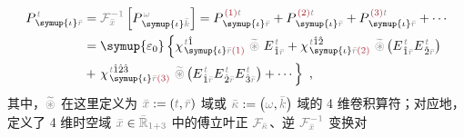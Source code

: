 \begin{subequations}
	\abovedisplayskip=10pt
	\belowdisplayskip=12pt
\begin{align}
	P^{\;\!\mathcolor{gray}{t}}_{\;\! \symup{\iota}\mathcolor{gray}{\bar{r}}} &= \mathcolor{gray}{\mathcal F_{\bar{x}}^{-1}} \left[ P^{\;\! \mathcolor{gray}{\omega}}_{\;\! \symup{\iota}\mathcolor{gray}{\bar{k}}} \right] = P^{\;\! \textcolor{Maroon}{(1)} \mathcolor{gray}{t}}_{\;\! \symup{\iota}\mathcolor{gray}{\bar{r}}} + P^{\;\! \textcolor{Maroon}{(2)} \mathcolor{gray}{t}}_{\;\! \symup{\iota}\mathcolor{gray}{\bar{r}}} + P^{\;\! \textcolor{Maroon}{(3)} \mathcolor{gray}{t}}_{\;\! \symup{\iota}\mathcolor{gray}{\bar{r}}} + \cdots \\ &= {\symup{\varepsilon_0}} \left\{ \chi^{\;\! \mathcolor{gray}{t} \hat{1}}_{\;\! \symup{\iota} \mathcolor{gray}{\bar{r}} \textcolor{Maroon}{(1)}} ~\mathcolor{gray}{\widetilde \circledast}~ E^{\;\!\mathcolor{gray}{t}}_{\;\! \hat{1} \mathcolor{gray}{\bar{r}}} + \chi^{\;\! \mathcolor{gray}{t} \hat{1} \hat{2}}_{\;\! \symup{\iota} \mathcolor{gray}{\bar{r}} \textcolor{Maroon}{(2)}}~\mathcolor{gray}{\widetilde \circledast}\left( E^{\;\!\mathcolor{gray}{t}}_{\;\! \hat{1} \mathcolor{gray}{\bar{r}}} E^{\;\!\mathcolor{gray}{t}}_{\;\! \hat{2} \mathcolor{gray}{\bar{r}}} \right) \right. \label{eq:P_tr} \\ &+ \left. \chi^{\;\! \mathcolor{gray}{t} \hat{1} \hat{2} \hat{3}}_{\;\! \symup{\iota} \mathcolor{gray}{\bar{r}} \textcolor{Maroon}{(3)}}~\mathcolor{gray}{\widetilde \circledast}\left( E^{\;\!\mathcolor{gray}{t}}_{\;\! \hat{1} \mathcolor{gray}{\bar{r}}} E^{\;\!\mathcolor{gray}{t}}_{\;\! \hat{2} \mathcolor{gray}{\bar{r}}} E^{\;\!\mathcolor{gray}{t}}_{\;\! \hat{3} \mathcolor{gray}{\bar{r}}} \right) + \cdots \right\}~,
\end{align}
\end{subequations}
其中，$\mathcolor{gray}{\widetilde \circledast}$ 在这里定义为 $\mathcolor{gray}{\bar{x}} := \left( \mathcolor{gray}{t}, \mathcolor{gray}{\bar{r}} \right)$ 域或 $\mathcolor{gray}{\bar{\kappa}} := \left( \mathcolor{gray}{\omega}, \mathcolor{gray}{\bar{k}} \right)$ 域的 4 维卷积算符；对应地，定义了 4 维时空域 $\mathcolor{gray}{\bar{x}} \in \mathcolor{gray}{\bar{\mathbb{R}}_{1+3}}$ 中的傅立叶正 $\mathcolor{gray}{\mathcal F_{\bar{\kappa}}}$、逆 $\mathcolor{gray}{\mathcal F_{\bar{x}}^{-1}}$ 变换对
